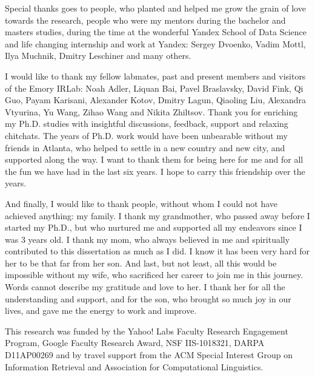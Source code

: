 {Special thanks goes to people, who planted and helped me grow the grain of love towards the research, people who were my mentors during the bachelor and masters studies, during the time at the wonderful Yandex School of Data Science and life changing internship and work at Yandex: Sergey Dvoenko, Vadim Mottl, Ilya Muchnik, Dmitry Leschiner and many others.

I would like to thank my fellow labmates, past and present members and visitors of the Emory IRLab: Noah Adler, Liquan Bai, Pavel Braslavsky, David Fink, Qi Guo, Payam Karisani, Alexander Kotov, Dmitry Lagun, Qiaoling Liu, Alexandra Vtyurina, Yu Wang, Zihao Wang and Nikita Zhiltsov.
Thank you for enriching my Ph.D. studies with insightful discussions, feedback, support and relaxing chitchats.
The years of Ph.D. work would have been unbearable without my friends in Atlanta, who helped to settle in a new country and new city, and supported along the way.
I want to thank them for being here for me and for all the fun we have had in the last six years.
I hope to carry this friendship over the years.

And finally, I would like to thank people, without whom I could not have achieved anything: my family.
I thank my grandmother, who passed away before I started my Ph.D., but who nurtured me and supported all my endeavors since I was 3 years old.
I thank my mom, who always believed in me and spiritually contributed to this dissertation as much as I did.
I know it has been very hard for her to be that far from her son.
And last, but not least, all this would be impossible without my wife, who sacrificed her career to join me in this journey.
Words cannot describe my gratitude and love to her.
I thank her for all the understanding and support, and for the son, who brought so much joy in our lives, and gave me the energy to work and improve.

This research was funded by the Yahoo! Labs Faculty Research Engagement Program, Google Faculty Research Award, NSF IIS-1018321, DARPA D11AP00269 and by travel support from the ACM Special Interest Group on Information Retrieval and Association for Computational Linguistics.
}

